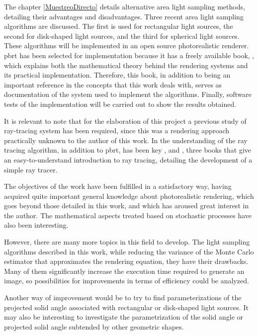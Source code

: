 The chapter \ref{MuestreoDirecto} details alternative area light sampling methods, detailing their advantages and disadvantages. Three recent area light sampling algorithms are discussed. The first is used for rectangular light sources, the second for disk-shaped light sources, and the third for spherical light sources. These algorithms will be implemented in an open source photorealistic renderer. pbrt has been selected for implementation because it has a freely available book, \cite{Pharr2016}, which explains both the mathematical theory behind the rendering systems and its practical implementation. Therefore, this book, in addition to being an important reference in the concepts that this work deals with, serves as documentation of the system used to implement the algorithms. Finally, software tests of the implementation will be carried out to show the results obtained.

It is relevant to note that for the elaboration of this project a previous study of ray-tracing system has been required, since this was a rendering approach practically unknown to the author of this work. In the understanding of the ray tracing algorithm, in addition to pbrt, has been key \cite{Shirley2020RTW1}, \cite{Shirley2020RTW2} and \cite{Shirley2020RTW3}, three books that give an easy-to-understand introduction to ray tracing, detailing the development of a simple ray tracer.\\


The objectives of the work have been fulfilled in a satisfactory way, having acquired quite important general knowledge about photorealistic rendering, which goes beyond those detailed in this work, and which has aroused great interest in the author. The mathematical aspects treated based on stochastic processes have also been interesting.

However, there are many more topics in this field to develop. The light sampling algorithms described in this work, while reducing the variance of the Monte Carlo estimator that approximates the rendering equation, they have their drawbacks. Many of them significantly increase the execution time required to generate an image, so possibilities for improvements in terms of efficiency could be analyzed. 

Another way of improvement would be to try to find parameterizations of the projected solid angle associated with rectangular or disk-shaped light sources. It may also be interesting to investigate the parametrization of the solid angle or projected solid angle subtended by other geometric shapes.

